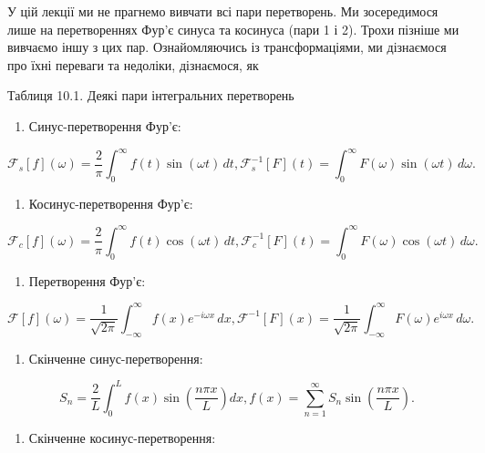 \documentclass[
  ukrainian,
]{article}
\providecommand{\tightlist}{%
  \setlength{\itemsep}{0pt}\setlength{\parskip}{0pt}}
\begin{document}
У цій лекції ми не прагнемо вивчати всі пари перетворень. Ми
зосередимося лише на перетвореннях Фур'є синуса та косинуса (пари 1 і
2). Трохи пізніше ми вивчаємо іншу з цих пар. Ознайомляючись із
трансформаціями, ми дізнаємося про їхні переваги та недоліки,
дізнаємося, як

Таблиця 10.1. Деякі пари інтегральних перетворень

\begin{enumerate}
\def\labelenumi{\arabic{enumi}.}
\tightlist
\item
  Синус-перетворення Фур'є:
\end{enumerate}

\[
\mathcal{F}_s[f](\omega) = \frac{2}{\pi}\int_0^\infty f(t)\sin(\omega t)\,dt,
\mathcal{F}_s^{-1}[F](t) = \int_0^\infty F(\omega)\sin(\omega t)\,d\omega.
\]

\begin{enumerate}
\def\labelenumi{\arabic{enumi}.}
\setcounter{enumi}{1}
\tightlist
\item
  Косинус-перетворення Фур'є:
\end{enumerate}

\[
\mathcal{F}_c[f](\omega) = \frac{2}{\pi}\int_0^\infty f(t)\cos(\omega t)\,dt,
\mathcal{F}_c^{-1}[F](t) = \int_0^\infty F(\omega)\cos(\omega t)\,d\omega.
\]

\begin{enumerate}
\def\labelenumi{\arabic{enumi}.}
\setcounter{enumi}{2}
\tightlist
\item
  Перетворення Фур'є:
\end{enumerate}

\[
\mathcal{F}[f](\omega) = \frac{1}{\sqrt{2\pi}}\int_{-\infty}^{\infty} f(x)e^{-i\omega x}\,dx,
\mathcal{F}^{-1}[F](x) = \frac{1}{\sqrt{2\pi}}\int_{-\infty}^{\infty} F(\omega)e^{i\omega x}\,d\omega.
\]

\begin{enumerate}
\def\labelenumi{\arabic{enumi}.}
\setcounter{enumi}{3}
\tightlist
\item
  Скінченне синус-перетворення:
\end{enumerate}

\[
S_n = \frac{2}{L}\int_0^L f(x)\sin\!\left(\frac{n\pi x}{L}\right) dx,
f(x) = \sum_{n=1}^{\infty} S_n \sin\!\left(\frac{n\pi x}{L}\right).
\]

\begin{enumerate}
\def\labelenumi{\arabic{enumi}.}
\setcounter{enumi}{4}
\tightlist
\item
  Скінченне косинус-перетворення:
\end{enumerate}
\end{document}
